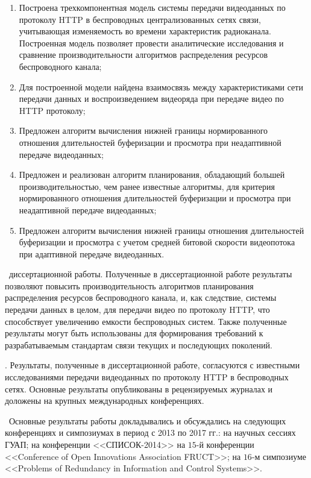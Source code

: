 \novelty
\begin{enumerate}
    \item Построена трехкомпонентная модель системы передачи видеоданных по протоколу HTTP в беспроводных централизованных сетях связи, учитывающая изменяемость во времени характеристик радиоканала. Построенная модель позволяет провести аналитические исследования и сравнение производительности алгоритмов распределения ресурсов беспроводного канала;
    \item Для построенной модели найдена взаимосвязь между характеристиками сети передачи данных и воспроизведением видеоряда при передаче видео по HTTP протоколу;
    \item Предложен алгоритм вычисления нижней границы нормированного отношения длительностей буферизации и просмотра при неадаптивной передаче видеоданных;
    \item Предложен и реализован алгоритм планирования, обладающий большей производительностью, чем ранее известные алгоритмы, для критерия нормированного отношения длительностей буферизации и просмотра при неадаптивной передаче видеоданных;
    \item Предложен алгоритм вычисления нижней границы отношения длительностей буферизации и просмотра с учетом средней битовой скорости видеопотока при адаптивной передаче видеоданных.
\end{enumerate}

\influence\ диссертационной работы. Полученные в диссертационной работе результаты позволяют повысить производительность алгоритмов планирования распределения ресурсов беспроводного канала, и, как следствие, системы передачи данных в целом, для передачи видео по протоколу HTTP, что способствует увеличению емкости беспроводных систем. Также полученные результаты могут быть использованы для формирования требований к разрабатываемым стандартам связи текущих и последующих поколений.

\reliability. Результаты, полученные в диссертационной работе, согласуются с известными исследованиями передачи видеоданных по протоколу HTTP в беспроводных сетях. Основные результаты опубликованы в рецензируемых журналах и доложены на крупных международных конференциях.

\probation\ Основные результаты работы докладывались и обсуждались на следующих конференциях и симпозиумах в период с 2013 по 2017 гг.: на научных сессиях ГУАП; на конференции <<СПИСОК-2014>> на $15$-й конференции <<Conference of Open Innovations Association FRUCT>>; на $16$-м симпозиуме <<Problems of Redundancy in Information and Control Systems>>.

